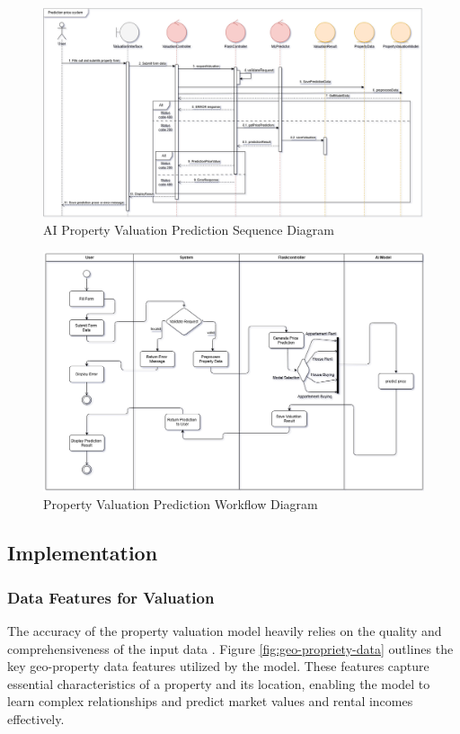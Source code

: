 \newpage

\begin{figure}[htbp]
    \centering
    \includegraphics[width=1.1\textwidth]{images/sequence_AI_prediction_model.png}
    \caption{AI Property Valuation Prediction Sequence Diagram}
    \label{fig:ai-prediction-sequence-model}
\end{figure}

\begin{figure}[htbp]
    \centering
    \includegraphics[width=1\textwidth]{images/valuation_workflow_diagram.png}
    \caption{Property Valuation Prediction Workflow Diagram}
    \label{fig:valuation-workflow}
\end{figure}

\subsection{Implementation}
\subsubsection{Data Features for Valuation}
The accuracy of the property valuation model heavily relies on the quality and comprehensiveness of the input data \cite{PatelAIRealEstate2024}. Figure \ref{fig:geo-propriety-data} outlines the key geo-property data features utilized by the model. These features capture essential characteristics of a property and its location, enabling the model to learn complex relationships and predict market values and rental incomes effectively.

